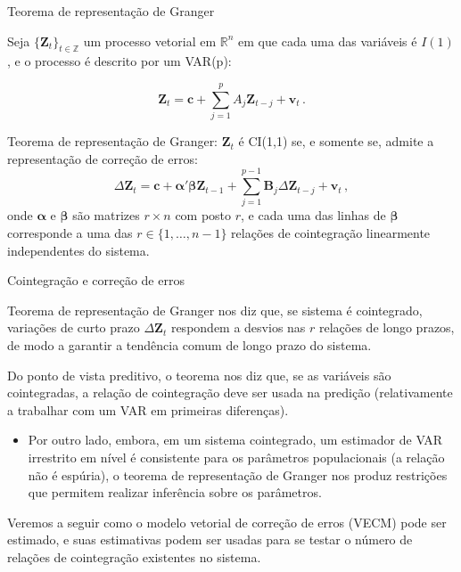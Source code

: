 \documentclass[11pt]{beamer}
\newenvironment{wideitemize}{\itemize\addtolength{\itemsep}{10pt}}{\enditemize}
\begin{document}
\begin{frame}{Teorema de representação de Granger}
	\begin{wideitemize}
		\item Seja $\{\boldsymbol{Z}_t\}_{t\in \mathbb{Z}}$ um processo vetorial em $\mathbb{R}^n$ em que cada uma das variáveis é $I(1)$, e o processo é descrito por um VAR(p):
		
		\begin{equation}
			\boldsymbol{Z}_t = \boldsymbol{c} + \sum_{j=1}^p A_j \boldsymbol{Z}_{t-j} + \boldsymbol{v}_t \, . 
		\end{equation}
		\item {\color{blue}Teorema de representação de Granger:} $\boldsymbol{Z}_t$ é CI(1,1) se, e somente se, admite a {\color{blue}representação de correção de erros}:
		\begin{equation}
			\label{coint_system}
			\Delta \boldsymbol{Z}_t  =  \boldsymbol{c} + \boldsymbol{\alpha}'\boldsymbol{\beta} \boldsymbol{Z}_{t-1} + \sum_{j=1}^{p-1} \boldsymbol{B}_{j} \Delta  \boldsymbol{Z}_{t-j} + \boldsymbol{v}_t \, , 
		\end{equation}
		onde $\boldsymbol{\alpha}$ e $ \boldsymbol{\beta}$ são matrizes $r \times n$ com posto $r$, e cada uma das linhas de $\boldsymbol{\beta}$ corresponde a uma das $r \in \{1,\ldots, n-1\}$ relações de cointegração linearmente independentes do sistema.

	\end{wideitemize}
\end{frame}

\begin{frame}{Cointegração e correção de erros}
\begin{wideitemize}
	 		\item Teorema de representação de Granger nos diz que, se sistema é cointegrado, variações de curto prazo $\Delta \boldsymbol{Z}_t$ respondem a desvios nas $r$ relações de longo prazos, de modo a garantir a tendência comum de longo prazo do sistema.
	 		\item Do ponto de vista preditivo, o teorema nos diz que, se as variáveis são cointegradas, a relação de cointegração deve ser usada na predição (relativamente a trabalhar com um VAR em primeiras diferenças).
	 		\begin{itemize}
	 			\item Por outro lado, embora, em um sistema cointegrado, um estimador de VAR irrestrito em nível é consistente para os parâmetros populacionais (a relação não é espúria), o teorema de representação de Granger nos produz restrições que permitem realizar inferência sobre os parâmetros.
	 		\end{itemize}
	 		\item Veremos a seguir como o modelo vetorial de correção de erros (VECM) pode ser estimado, e suas estimativas podem ser usadas para se testar o número de relações de cointegração existentes no sistema.
	 	\end{wideitemize}
\end{frame}
\end{document}

